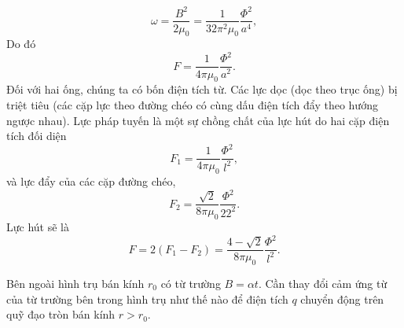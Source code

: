 \begin{loigiai}
\begin{enumerate}[1)]
    \[\omega = \dfrac{B^{2}}{2 \mu_{0}}=\dfrac{1}{32 \pi^{2} \mu_{0}} \dfrac{\Phi^{2}}{a^{4}},\]
    Do đó
    \[F=\dfrac{1}{4 \pi \mu_{0}} \dfrac{\Phi^{2}}{a^{2}}.\]
    Đối với hai ống, chúng ta có bốn điện tích từ. Các lực dọc (dọc theo trục ống) bị triệt tiêu (các cặp lực theo đường chéo có cùng dấu điện tích đẩy theo hướng ngược nhau). Lực pháp tuyến là một sự chồng chất của lực hút do hai cặp điện tích đối diện
    \[F_{1} = \dfrac{1}{4 \pi \mu_{0}} \dfrac{\Phi^{2}}{l^{2}},\]
    và lực đẩy của các cặp đường chéo,
    \[F_{2}=\dfrac{\sqrt{2}}{8 \pi \mu_{0}} \dfrac{\Phi^{2}}{22^{2}}.\]
    Lực hút sẽ là
    \[F = 2\left(F_{1}-F_{2}\right)=\dfrac{4-\sqrt{2}}{8 \pi \mu_{0}} \dfrac{\Phi^{2}}{l^{2}}.\]
\end{enumerate}
\end{loigiai}


\begin{vd}%
Bên ngoài hình trụ bán kính $r_0$ có từ trường $B=\alpha t$. Cần thay đổi cảm ứng từ của từ trường bên trong hình trụ như thế nào để điện tích $q$ chuyển động trên quỹ đạo tròn bán kính $r>r_0$.
\begin{center}

\end{center}
\end{vd}
